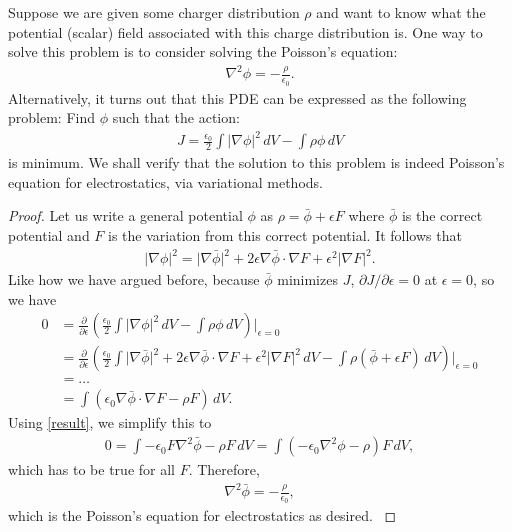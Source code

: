 \documentclass{article}
\newcommand{\p}{\partial}
\newcommand{\f}[2]{\frac{#1}{#2}}
\newcommand{\lp}{\left(}
\newcommand{\rp}{\right)}
\begin{document}
Suppose we are given some charger distribution $\rho$ and want to know what the potential (scalar) field associated with this charge distribution is. One way to solve this problem is to consider solving the Poisson's equation:
\begin{align}
\nabla^2 \phi = -\f{\rho}{\epsilon_0}.
\end{align}
Alternatively, it turns out that this PDE can be expressed as the following problem: Find $\phi$ such that the action:
\begin{align}
J = \f{\epsilon_0}{2}\int \vert \nabla \phi\vert^2 \,dV - \int \rho \phi \,dV 
\end{align}
is minimum. We shall verify that the solution to this problem is indeed Poisson's equation for electrostatics, via variational methods. \\

\begin{proof}
Let us write a general potential $\phi$ as $\rho = \bar{\phi} + \epsilon F$ where $\bar{\phi}$ is the correct potential and $F$ is the variation from this correct potential. It follows that
\begin{align}
\vert \nabla \phi \vert^2 = \vert \nabla \bar{\phi} \vert^2 + 2\epsilon \nabla \bar{\phi}\cdot  \nabla F  + \epsilon^2\vert \nabla F \vert^2.
\end{align}
Like how we have argued before, because $\bar{\phi}$ minimizes $J$, $\p J/\p \epsilon = 0$ at $\epsilon = 0$, so we have
\begin{align}
0 &= \f{\p}{\p \epsilon}\lp \f{\epsilon_0}{2}\int \vert \nabla \phi\vert^2 \,dV - \int \rho \phi \,dV  \rp \bigg\vert_{\epsilon=0} \nonumber\\
&= \f{\p}{\p \epsilon}\lp \f{\epsilon_0}{2}\int \vert \nabla \bar{\phi} \vert^2 + 2\epsilon \nabla \bar{\phi}\cdot \nabla F + \epsilon^2\vert \nabla F \vert^2 \,dV - \int \rho (\bar{\phi} + \epsilon F) \,dV  \rp \bigg\vert_{\epsilon=0}\nonumber\\
&= \dots\nonumber\\
&= \int \lp\epsilon_0 \nabla \bar{\phi}\cdot \nabla F - \rho F\rp\,dV.
\end{align}
Using \eqref{result}, we simplify this to
\begin{align}
0 = \int -\epsilon_0F\nabla^2\bar{\phi} - \rho F \,dV = \int (-\epsilon_0\nabla^2 \phi - \rho )F\,dV,
\end{align}
which has to be true for all $F$. Therefore, 
\begin{align}
\nabla^2\bar{\phi} = -\f{\rho}{\epsilon_0},
\end{align}
which is the Poisson's equation for electrostatics as desired. \cite{FEYN}
\end{proof}
\end{document}
